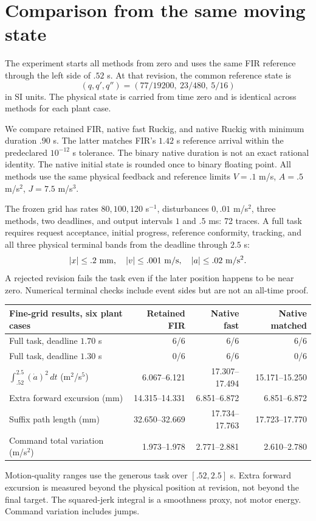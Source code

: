 \documentclass[10pt,letterpaper]{article}
\begin{document}
\section{Comparison from the same moving state}
The experiment starts all methods from zero and uses the same FIR reference
through the left side of $.52$ s. At that revision, the common reference state is
\[
 (q,q',q'')=(77/19200,\ 23/480,\ 5/16)
\]
in SI units. The physical state is carried from time zero and is identical
across methods for each plant case.

We compare retained FIR, native fast Ruckig, and native Ruckig with minimum
duration $.90$ s. The latter matches FIR's $1.42$ s reference arrival within
the predeclared $10^{-12}$ s tolerance. The binary native duration is not an
exact rational identity. The native initial state is rounded once to binary
floating point. All methods use the same physical feedback and reference
limits $V=.1$ m/s, $A=.5$ m/s$^2$, $J=7.5$ m/s$^3$.

The frozen grid has rates $80,100,120$ s$^{-1}$, disturbances $0,.01$ m/s$^2$,
three methods, two deadlines, and output intervals $1$ and $.5$ ms:
72 traces. A full task requires request acceptance, initial progress,
reference conformity, tracking, and all three physical terminal bands from
the deadline through $2.5$ s:
\[
 |x|\leq.2\ {\rm mm},\quad |v|\leq.001\ {\rm m/s},\quad
 |a|\leq.02\ {\rm m/s^2}.
\]
A rejected revision fails the task even if the later position happens to be
near zero. Numerical terminal checks include event sides but are not an
all-time proof.

\begin{center}\small
\begin{tabular}{lrrr}
\toprule
Fine-grid results, six plant cases & Retained FIR & Native fast & Native matched\\
\midrule
Full task, deadline $1.70$ s & 6/6 & 6/6 & 6/6\\
Full task, deadline $1.30$ s & 0/6 & 6/6 & 0/6\\
$\int_{.52}^{2.5}(\dot a)^2\,dt$ (m$^2$/s$^5$)
 & 6.067--6.121 & 17.307--17.494 & 15.171--15.250\\
Extra forward excursion (mm)
 & 14.315--14.331 & 6.851--6.872 & 6.851--6.872\\
Suffix path length (mm)
 & 32.650--32.669 & 17.734--17.763 & 17.723--17.770\\
Command total variation (m/s$^2$)
 & 1.973--1.978 & 2.771--2.881 & 2.610--2.780\\
\bottomrule
\end{tabular}
\end{center}
Motion-quality ranges use the generous task over $[.52,2.5]$ s. Extra forward
excursion is measured beyond the physical position at revision, not beyond
the final target. The squared-jerk integral is a smoothness proxy, not motor
energy. Command variation includes jumps.
\end{document}
